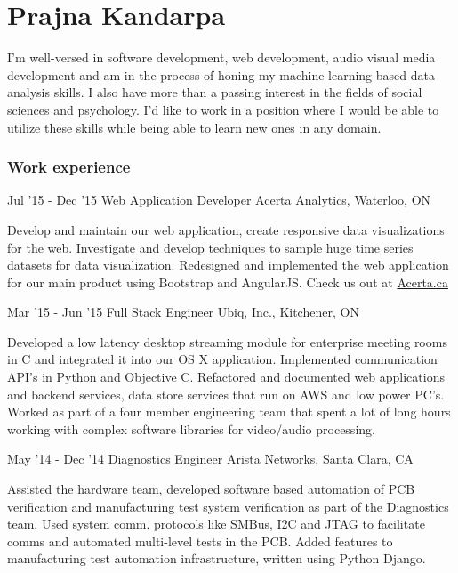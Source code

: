 \documentclass{tccv}
\begin{document}
\part{Prajna Kandarpa}
I'm well-versed in software development, web development, audio visual media development and am in the process of honing my machine learning based data analysis skills. I also have more than a passing interest in the fields of social sciences and psychology. I'd like to work in a position where I would be able to utilize these skills while being able to learn new ones in any domain. 
\section{Work experience}

\begin{eventlist}

\item{Jul '15 - Dec '15}
    {Web Application Developer}
    {Acerta Analytics, Waterloo, ON}

Develop and maintain our web application, create responsive data visualizations for the web. Investigate and develop techniques to sample huge time series datasets for data visualization. Redesigned and implemented the web application for our main product using Bootstrap and AngularJS. Check us out at \href{http://www.acerta.ca}{Acerta.ca}

\item{Mar '15 - Jun '15}
     {Full Stack Engineer}
     {Ubiq, Inc., Kitchener, ON}

Developed a low latency desktop streaming module for enterprise meeting rooms in C and integrated it into our OS X application. Implemented communication API's in Python and Objective C. Refactored and documented web applications and backend services, data store services that run on AWS and low power PC's. Worked as part of a four member engineering team that spent a lot of long hours working with complex software libraries for video/audio processing.

\item{May '14 - Dec '14}
     {Diagnostics Engineer}
     {Arista Networks, Santa Clara, CA}

Assisted the hardware team, developed software based automation of PCB verification and manufacturing test system verification as part of the Diagnostics team. Used system comm. protocols like SMBus, I2C and JTAG to facilitate comms and automated multi-level tests in the PCB. Added features to manufacturing test automation infrastructure, written using Python Django.


\end{eventlist}
\end{document}
